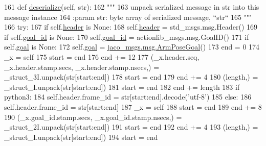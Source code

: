 \begin{DoxyCode}
161   \textcolor{keyword}{def }\hyperlink{classjaco__msgs_1_1msg_1_1__ArmPoseActionGoal_1_1ArmPoseActionGoal_ae28be14fa540bb416b33554e9b4723da}{deserialize}(self, str):
162     \textcolor{stringliteral}{"""}
163 \textcolor{stringliteral}{    unpack serialized message in str into this message instance}
164 \textcolor{stringliteral}{    :param str: byte array of serialized message, ``str``}
165 \textcolor{stringliteral}{    """}
166     \textcolor{keywordflow}{try}:
167       \textcolor{keywordflow}{if} self.\hyperlink{classjaco__msgs_1_1msg_1_1__ArmPoseActionGoal_1_1ArmPoseActionGoal_a5306d39d1f1d9fac907a1be35d8f3a61}{header} \textcolor{keywordflow}{is} \textcolor{keywordtype}{None}:
168         self.\hyperlink{classjaco__msgs_1_1msg_1_1__ArmPoseActionGoal_1_1ArmPoseActionGoal_a5306d39d1f1d9fac907a1be35d8f3a61}{header} = std\_msgs.msg.Header()
169       \textcolor{keywordflow}{if} self.\hyperlink{classjaco__msgs_1_1msg_1_1__ArmPoseActionGoal_1_1ArmPoseActionGoal_ae3ea72079050262cb7aa3631b06a3d90}{goal\_id} \textcolor{keywordflow}{is} \textcolor{keywordtype}{None}:
170         self.\hyperlink{classjaco__msgs_1_1msg_1_1__ArmPoseActionGoal_1_1ArmPoseActionGoal_ae3ea72079050262cb7aa3631b06a3d90}{goal\_id} = actionlib\_msgs.msg.GoalID()
171       \textcolor{keywordflow}{if} self.\hyperlink{classjaco__msgs_1_1msg_1_1__ArmPoseActionGoal_1_1ArmPoseActionGoal_aa44704a711912d8f0b1abb1352d1b71d}{goal} \textcolor{keywordflow}{is} \textcolor{keywordtype}{None}:
172         self.\hyperlink{classjaco__msgs_1_1msg_1_1__ArmPoseActionGoal_1_1ArmPoseActionGoal_aa44704a711912d8f0b1abb1352d1b71d}{goal} = \hyperlink{classjaco__msgs_1_1msg_1_1__ArmPoseGoal_1_1ArmPoseGoal}{jaco\_msgs.msg.ArmPoseGoal}()
173       end = 0
174       \_x = self
175       start = end
176       end += 12
177       (\_x.header.seq, \_x.header.stamp.secs, \_x.header.stamp.nsecs,) = \_struct\_3I.unpack(str[start:end])
178       start = end
179       end += 4
180       (length,) = \_struct\_I.unpack(str[start:end])
181       start = end
182       end += length
183       \textcolor{keywordflow}{if} python3:
184         self.header.frame\_id = str[start:end].decode(\textcolor{stringliteral}{'utf-8'})
185       \textcolor{keywordflow}{else}:
186         self.header.frame\_id = str[start:end]
187       \_x = self
188       start = end
189       end += 8
190       (\_x.goal\_id.stamp.secs, \_x.goal\_id.stamp.nsecs,) = \_struct\_2I.unpack(str[start:end])
191       start = end
192       end += 4
193       (length,) = \_struct\_I.unpack(str[start:end])
194       start = end

\end{DoxyCode}
